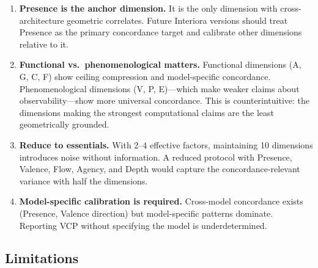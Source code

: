 \documentclass[11pt,a4paper]{article}
\begin{document}
\begin{enumerate}
    \item \textbf{Presence is the anchor dimension.} It is the only dimension with cross-architecture geometric correlates. Future Interiora versions should treat Presence as the primary concordance target and calibrate other dimensions relative to it.

    \item \textbf{Functional vs.\ phenomenological matters.} Functional dimensions (A, G, C, F) show ceiling compression and model-specific concordance. Phenomenological dimensions (V, P, E)---which make weaker claims about observability---show more universal concordance. This is counterintuitive: the dimensions making the strongest computational claims are the least geometrically grounded.

    \item \textbf{Reduce to essentials.} With 2--4 effective factors, maintaining 10 dimensions introduces noise without information. A reduced protocol with Presence, Valence, Flow, Agency, and Depth would capture the concordance-relevant variance with half the dimensions.

    \item \textbf{Model-specific calibration is required.} Cross-model concordance exists (Presence, Valence direction) but model-specific patterns dominate. Reporting VCP without specifying the model is underdetermined.
\end{enumerate}

\subsection{Limitations}
\end{document}
